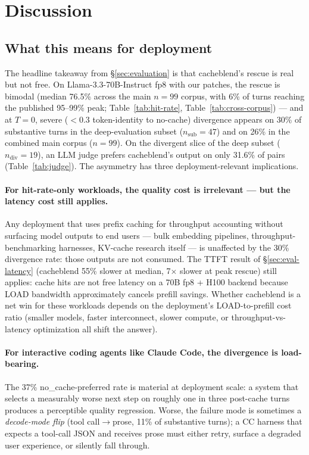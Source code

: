 
\section{Discussion}
\label{sec:discussion}

\subsection{What this means for deployment}

The headline takeaway from \S\ref{sec:evaluation} is that cacheblend's
rescue is real but not free. On Llama-3.3-70B-Instruct fp8 with our
patches, the rescue is bimodal (median 76.5\% across the main
$n{=}99$ corpus, with 6\% of turns reaching the published 95--99\%
peak; Table~\ref{tab:hit-rate}, Table~\ref{tab:cross-corpus}) ---
and at $T{=}0$, severe ($<$0.3 token-identity to no-cache) divergence
appears on 30\% of substantive turns in the deep-evaluation subset
($n_{\text{sub}}{=}47$) and on 26\% in the combined main corpus
($n{=}99$). On the divergent slice of the deep subset
($n_{\text{div}}{=}19$), an LLM judge prefers cacheblend's output
on only 31.6\% of pairs (Table~\ref{tab:judge}). The asymmetry has
three deployment-relevant implications.

\paragraph{For hit-rate-only workloads, the quality cost is irrelevant
--- but the latency cost still applies.} Any deployment that uses
prefix caching for throughput accounting without surfacing model
outputs to end users --- bulk embedding pipelines,
throughput-benchmarking harnesses, KV-cache research itself --- is
unaffected by the 30\% divergence rate: those outputs are not
consumed. The TTFT result of \S\ref{sec:eval-latency} (cacheblend 55\% slower at
median, 7$\times$ slower at peak rescue) still applies: cache hits
are not free latency on a 70B fp8 + H100 backend because LOAD
bandwidth approximately cancels prefill savings. Whether cacheblend
is a net win for these workloads depends on the deployment's
LOAD-to-prefill cost ratio (smaller models, faster interconnect,
slower compute, or throughput-vs-latency optimization all shift the
answer).

\paragraph{For interactive coding agents like Claude Code, the
divergence is load-bearing.} The 37\% no\_cache-preferred rate is
material at deployment scale: a system that selects a measurably
worse next step on roughly one in three post-cache turns produces a
perceptible quality regression. Worse, the failure mode is sometimes
a \emph{decode-mode flip} (tool call$\to$prose, 11\% of substantive
turns); a CC harness that expects a tool-call JSON and receives prose
must either retry, surface a degraded user experience, or silently
fall through.


